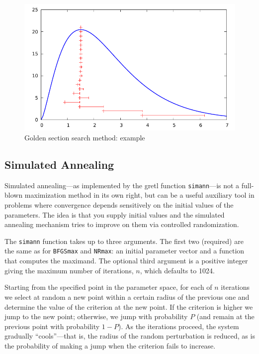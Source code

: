\begin{figure}[htpb]
  \centering
  \includegraphics[scale=0.8]{figures/gss}
  \caption{Golden section search method: example}
  \label{fig:goldenratio}
\end{figure}


\subsection{Simulated Annealing}
\label{sec:sim-anneal}

Simulated annealing---as implemented by the gretl function
\texttt{simann}---is not a full-blown maximization method in its own
right, but can be a useful auxiliary tool in problems where
convergence depends sensitively on the initial values of the
parameters. The idea is that you supply initial values and the
simulated annealing mechanism tries to improve on them via controlled
randomization.

The \texttt{simann} function takes up to three arguments. The first
two (required) are the same as for \texttt{BFGSmax} and
\texttt{NRmax}: an initial parameter vector and a function that
computes the maximand. The optional third argument is a positive
integer giving the maximum number of iterations, $n$, which defaults
to 1024.

Starting from the specified point in the parameter space, for each of
$n$ iterations we select at random a new point within a certain radius
of the previous one and determine the value of the criterion at the
new point. If the criterion is higher we jump to the new point;
otherwise, we jump with probability $P$ (and remain at the previous
point with probability $1-P$).  As the iterations proceed, the system
gradually ``cools''---that is, the radius of the random perturbation
is reduced, as is the probability of making a jump when the criterion
fails to increase.

